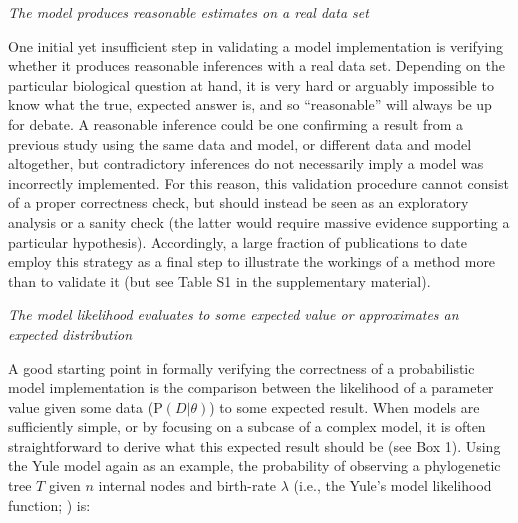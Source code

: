\documentclass[oneside]{article}
\begin{document}


\vspace{.25cm}
\noindent \emph{The model produces reasonable estimates on a real
  data set}

One initial yet insufficient step in validating a model implementation
is verifying whether it produces reasonable inferences with a real
data set.
Depending on the particular biological question at hand, it is very
hard or arguably impossible to know what the true, expected answer is,
and so ``reasonable'' will always be up for debate.
A reasonable inference could be one confirming a result from a previous study
using the same data and model, or different data and model
altogether, but contradictory inferences do not necessarily imply a model
was incorrectly implemented.
For this reason, this validation procedure cannot consist of a proper
correctness check, but should instead be seen as an exploratory
analysis or a sanity check (the latter would require massive
evidence supporting a particular hypothesis).
Accordingly, a large fraction of publications to date employ this
strategy as a final step to illustrate the workings of a method more
than to validate it (but see Table S1 in the supplementary material).

\vspace{.5cm}
\noindent \emph{The model likelihood evaluates to some
  expected value or approximates an expected distribution}

A good starting point in formally verifying the correctness of a
probabilistic model implementation is the comparison between the
likelihood of a parameter value given some data ($\text{P}(D|\theta)$) to
some expected result.
When models are sufficiently simple, or by focusing
on a subcase of a complex model, it is often straightforward to derive
what this expected result should be (see Box 1).
Using the Yule model again as an example, the probability of observing
a phylogenetic tree $T$ given $n$ internal nodes and birth-rate
$\lambda$ (i.e., the Yule's model likelihood function;
\citealp{nee01}) is:
\end{document}
